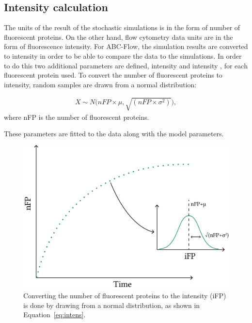 \clearpage
\subsection{Intensity calculation}

The units of the result of the stochastic simulations is in the form of number of fluorescent proteins. On the other hand, flow cytometry data units are in the form of fluorescence intensity. For ABC-Flow, the simulation results are converted to intensity in order to be able to compare the data to the simulations. In order to do this two additional parameters are defined, intensity \textmu{} and intensity \textsigma{}, for each fluorescent protein used. To convert the number of fluorescent proteins to intensity, random samples are drawn from a normal distribution:

\begin{align}
	X\sim N\Big(nFP\times\mu, \sqrt{(nFP\times\sigma^2)}\Big), \label{eq:intens}
\end{align}
where nFP is the number of fluorescent proteins. 


These parameters are fitted to the data along with the model parameters.  

\begin{figure}[tb]
	\begin{center}
		\includegraphics[scale=0.6]{../../chapters/chapterABCFlow/images/intensity_calc.png}
		\caption[LoF caption]{\label{fig:intensity_calc}Converting the number of fluorescent proteins to the intensity (iFP) is done by drawing from a normal distribution, as shown in Equation~\ref{eq:intens}.}
	\end{center}
\end{figure}

